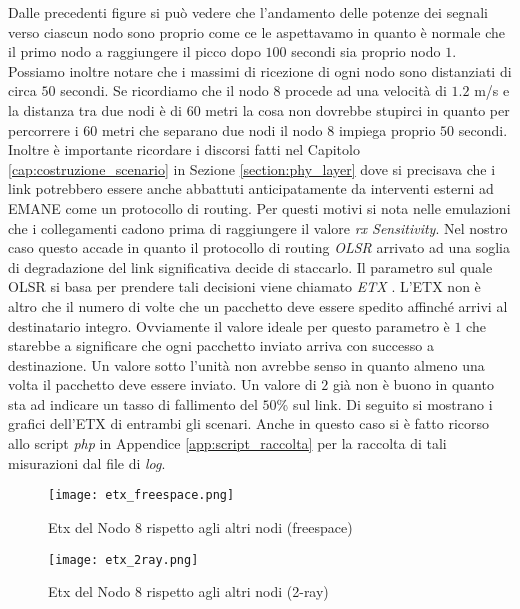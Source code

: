 Dalle precedenti figure si può vedere che l'andamento delle potenze dei segnali verso ciascun nodo sono proprio come ce le aspettavamo in quanto è normale che il primo nodo a raggiungere il picco dopo $100$ secondi sia proprio nodo $1$. Possiamo inoltre notare che i massimi di ricezione di ogni nodo sono distanziati di circa $50$ secondi. Se ricordiamo che il nodo $8$ procede ad una velocità di $1.2$ m/s e la distanza tra due nodi è di $60$ metri la cosa non dovrebbe stupirci in quanto per percorrere i $60$ metri che separano due nodi il nodo $8$ impiega proprio $50$ secondi. \\
Inoltre è importante ricordare i discorsi fatti nel Capitolo \ref{cap:costruzione_scenario} in Sezione \ref{section:phy_layer} dove si precisava che i link potrebbero essere anche abbattuti anticipatamente da interventi esterni ad EMANE come un protocollo di routing. Per questi motivi si nota nelle emulazioni che i collegamenti cadono prima di raggiungere il valore \textit{rx Sensitivity}. Nel nostro caso questo accade in quanto il protocollo di routing \textit{OLSR} arrivato ad una soglia di degradazione del link significativa decide di staccarlo. Il parametro sul quale OLSR si basa per prendere tali decisioni viene chiamato \textit{ETX} \cite{ETX}. L'ETX non è altro che il numero di volte che un pacchetto deve essere spedito affinché arrivi al destinatario integro. Ovviamente il valore ideale per questo parametro è $1$ che starebbe a significare che ogni pacchetto inviato arriva con successo a destinazione. Un valore sotto l'unità non avrebbe senso  in quanto almeno una volta il pacchetto deve essere inviato. Un valore di $2$  già non è buono in quanto sta ad indicare un tasso di fallimento del $50$\% sul link. Di seguito si mostrano i grafici dell'ETX di entrambi gli scenari. Anche in questo caso si è fatto ricorso allo script \textit{php} in Appendice \ref{app:script_raccolta} per la raccolta di tali misurazioni dal file di \textit{log}.

\begin{figure}[H]
	\centering
	\texttt{[image: etx\_freespace.png]}
	\caption{Etx del Nodo 8 rispetto agli altri nodi (freespace)}
	\label{fig:etx_freespace}
\end{figure}

\begin{figure}[H]
	\centering
	\texttt{[image: etx\_2ray.png]}
	\caption{Etx del Nodo 8 rispetto agli altri nodi (2-ray)}
	\label{fig:etx_2ray}
\end{figure}